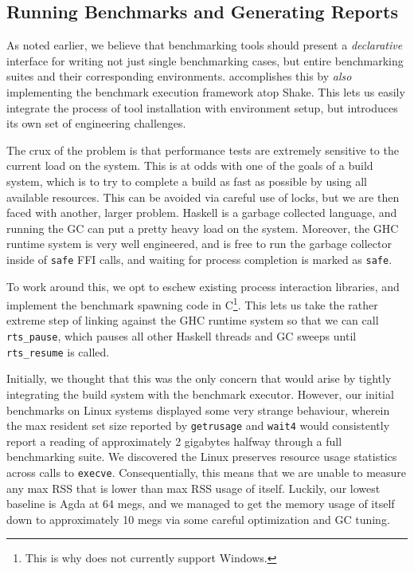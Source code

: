 \documentclass[a4paper,UKenglish,cleveref, autoref, thm-restate,anonymous]{lipics-v2021}
\begin{document}
\subsection{Running Benchmarks and Generating Reports}
\label{sec:reports}

As noted earlier, we believe that benchmarking
tools should present a \emph{declarative} interface for writing not just single
benchmarking cases, but entire benchmarking suites and their corresponding environments.
\panbench accomplishes this by \emph{also} implementing the benchmark execution framework
atop Shake. This lets us easily integrate the process of tool installation with environment
setup, but introduces its own set of engineering challenges.

The crux of the problem is that performance tests are extremely sensitive to the current
load on the system. This is at odds with one of the goals of a build system,
which is to try to complete a build as fast as possible by using all available
resources. This can be avoided via careful use of locks, but we are then faced
with another, larger problem. Haskell is a garbage collected language, and
running the GC can put a pretty heavy load on the system. Moreover, the GHC
runtime system is very well engineered, and is free to run the garbage
collector inside of \texttt{safe} FFI calls, and waiting for process completion
is marked as \texttt{safe}.

To work around this, we opt to eschew existing process interaction
libraries, and implement the benchmark spawning code in C\footnote{This is why
\panbench does not currently support Windows.}.
This lets us take the rather extreme step of linking against the GHC runtime system
so that we can call \texttt{rts_pause}, which pauses all other Haskell threads and GC
sweeps until \texttt{rts_resume} is called.

Initially, we thought that this was the only concern that would arise
by tightly integrating the build system with the benchmark executor.
However, our initial benchmarks on Linux systems displayed some very strange
behaviour, wherein the max resident set size reported by \texttt{getrusage}
and \texttt{wait4} would consistently report a reading of approximately
2 gigabytes halfway through a full benchmarking suite.
We discovered the Linux preserves resource usage statistics across calls to \texttt{execve}.
Consequentially, this means that we are unable to measure any max RSS that
is lower than max RSS usage of \panbench itself. Luckily, our lowest baseline is Agda at 64 megs,
and we managed to get the memory usage of \panbench itself down to approximately 10 megs via
some careful optimization and GC tuning.
\end{document}
